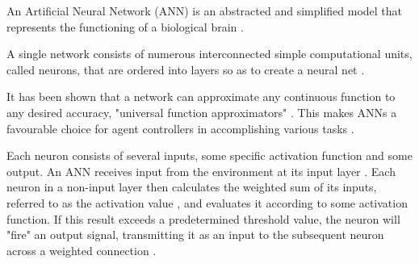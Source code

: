 An Artificial Neural Network (ANN) is an abstracted and simplified model that represents the functioning of a biological brain \cite{mcculloch1943logical}. 


A single network consists of numerous interconnected simple computational units, called neurons, that are ordered into layers so as to create a neural net \cite{RefWorks:31}.



It has been shown that a network can approximate any continuous function to any desired accuracy, "universal function approximators" \cite{zhang1998forecasting}. This makes ANNs a favourable choice for agent controllers in accomplishing various tasks \cite{yegnanarayana2009artificial}.


Each neuron consists of several inputs, some specific activation function and some output. 
An ANN receives input from the environment at its input layer \cite{RefWorks:32}.
Each neuron in a non-input layer then calculates the weighted sum of its inputs, referred to as the activation value \cite{yegnanarayana2009artificial,RefWorks:31}, and evaluates it according to some activation function. 
If this result exceeds a predetermined threshold value, the neuron will "fire" an output signal, transmitting it as an input to the subsequent neuron across a weighted connection \cite{yegnanarayana2009artificial}.

